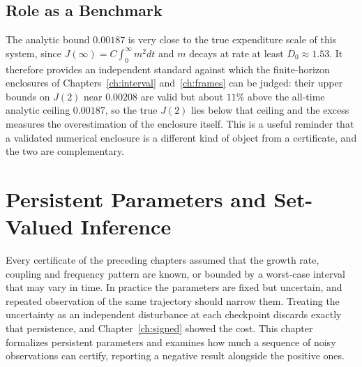 \documentclass[11pt,notitlepage]{report}
\theoremstyle{definition}
\theoremstyle{remark}
\begin{document}
\section{Role as a Benchmark}
The analytic bound $0.00187$ is very close to the true expenditure scale of this system, since $J(\infty)=C\int_0^\infty m^2dt$ and $m$ decays at rate at least $D_0\approx1.53$. It therefore provides an independent standard against which the finite-horizon enclosures of Chapters~\ref{ch:interval} and~\ref{ch:frames} can be judged: their upper bounds on $J(2)$ near $0.00208$ are valid but about $11\%$ above the all-time analytic ceiling $0.00187$, so the true $J(2)$ lies below that ceiling and the excess measures the overestimation of the enclosure itself. This is a useful reminder that a validated numerical enclosure is a different kind of object from a certificate, and the two are complementary.
\chapter{Persistent Parameters and Set-Valued Inference}\label{ch:params}

Every certificate of the preceding chapters assumed that the growth rate, coupling and frequency pattern are known, or bounded by a worst-case interval that may vary in time. In practice the parameters are fixed but uncertain, and repeated observation of the same trajectory should narrow them. Treating the uncertainty as an independent disturbance at each checkpoint discards exactly that persistence, and Chapter~\ref{ch:signed} showed the cost. This chapter formalizes persistent parameters and examines how much a sequence of noisy observations can certify, reporting a negative result alongside the positive ones.
\end{document}
